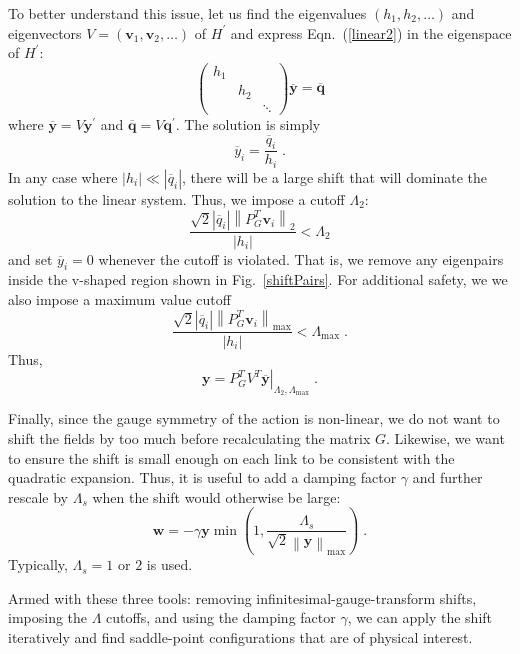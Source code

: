 \documentclass[preprint,aps,prd]{revtex4-2}
\newcommand{\be}{\begin{equation}}
\newcommand{\eq}{\end{equation}}
\newcommand{\heigen}{h}
\begin{document}
To better understand this issue, let us find the eigenvalues
$\left(\heigen_1, \heigen_2, \ldots\right)$ and
eigenvectors $V=\left(\mathbf{v}_1, \mathbf{v}_2, \ldots\right)$
of $H^\prime$ and express Eqn.~(\ref{linear2}) in the eigenspace of $H^\prime$:
\be
\begin{pmatrix}
    \heigen_1 & & \\
    & \heigen_2 & \\
    & & \ddots  \end{pmatrix} \overline{\mathbf{y}} =
  \overline{\mathbf{q}} \label{linear3}
\eq
where $\overline{\mathbf{y}} = V \mathbf{y}^\prime$ and
$\overline{\mathbf{q}}  = V \mathbf{q}^\prime$.
The solution is simply
\be
    \overline{y}_i = \frac{\overline{q}_i}{\heigen_i} \; .
\eq
In any case where $\left|\heigen_i\right|\ll
\left|\overline{q}_i\right|$,
there will be a large shift that will dominate the solution
to the linear system.
Thus, we impose a cutoff $\Lambda_2$:
\be
    \frac{\sqrt{2} \left|\overline{q}_i\right|\left\lVert P_G^T \mathbf{v}_i\right\rVert_2}{\left|\heigen_i\right|}
     < \Lambda_2 \label{lambda2}
\eq
%
and set $\overline{y}_i=0$ whenever the cutoff is violated.
That is, we remove any eigenpairs inside the v-shaped
region shown in Fig.~\ref{shiftPairs}.  For additional safety, we
we also impose a maximum value cutoff
\be
    \frac{\sqrt{2} \left|\overline{q}_i\right|
      \left\lVert P_G^T \mathbf{v}_i\right\rVert_\mathrm{max}}
    {\left|\heigen_i\right|}
    < \Lambda_\mathrm{max} \; .
\eq
Thus,
\be
      \mathbf{y} = P_G^T \left. V^T
                    \overline{\mathbf{y}}\right|_{\Lambda_2,\Lambda_\mathrm{max}} \; .
\eq

Finally, since the gauge symmetry of the action is non-linear,
we do not want to shift the fields by too much before recalculating
the matrix $G$.  Likewise, we want to ensure the shift is small
enough on each link to be consistent with the quadratic expansion.
Thus, it is useful to add a damping factor $\gamma$ and
further rescale by $\Lambda_s$ when the shift would
otherwise be large:
\be
  \mathbf{w} = - \gamma \mathbf{y} \min\left(1, \frac{\Lambda_s}{
    \sqrt{2} \left\lVert \mathbf{y}\right\rVert_\mathrm{max}}\right) \; .
\eq
Typically, $\Lambda_s = 1$ or $2$ is used.

Armed with these three tools:  removing infinitesimal-gauge-transform shifts,
imposing the $\Lambda$ cutoffs, and using the damping factor $\gamma$,
we can apply the shift iteratively and find saddle-point configurations
that are of physical interest.
\end{document}
